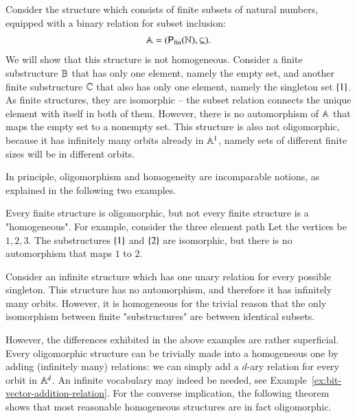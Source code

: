 	\begin{myexample}\label{ex:nat-powerset}
		Consider the structure which consists of finite subsets of  natural numbers, equipped with a binary relation for subset inclusion: 	
			\begin{align*}
				\mathbb A = ({\mathsf P}_{\text{fin}}({\mathbb N}),\subseteq).
			\end{align*}
	We will show that this structure is not homogeneous. Consider a finite substructure $\mathbb B$ that has only one element, namely the empty set, and another finite substructure $\mathbb C$ that also has only one element, namely the singleton set $\{1\}$. As finite structures, they are isomorphic -- the subset relation connects the unique element with itself in both of them. However, there is no automorphism of $\mathbb A$ that maps the empty set to a nonempty set. This structure is also not oligomorphic, because it has infinitely many orbits already in $\mathbb A^1$, namely sets of different finite sizes will be in different orbits.
		\end{myexample}

In principle, oligomorphism and homogeneity are incomparable notions, as explained in the following two examples.

\begin{myexample}
	Every finite structure is oligomorphic, but not every finite structure is a "homogeneous". For example, consider the three element path
	Let the vertices be $1,2,3$. The substructures $\{1\}$ and $\{2\}$ are isomorphic, but there is no automorphism that maps $1$ to $2$.
\end{myexample}
\begin{myexample}
Consider an infinite structure which has one unary relation for every possible singleton. This structure has no automorphism, and therefore it has infinitely many orbits. However, it is homogeneous for the trivial reason that the only isomorphism between finite "substructures" are between identical subsets.
\end{myexample}

However, the differences exhibited in the above examples are rather superficial. Every oligomorphic structure can be trivially made into a  homogeneous one by adding (infinitely many) relations: we can simply add a $d$-ary relation for every orbit in $\mathbb A^d$. An infinite vocabulary may indeed be needed, see Example~\ref{ex:bit-vector-addition-relation}.
For the converse implication, the  following theorem shows that most reasonable homogeneous structures are in fact oligomorphic.

